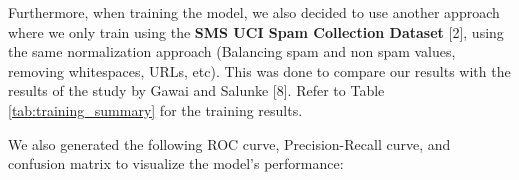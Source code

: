 \documentclass{article}
\begin{document}
\noindent
Furthermore, when training the model, we also decided to use another approach where we only train using the \textbf{SMS UCI Spam Collection Dataset} [2], using the same normalization approach (Balancing spam and non spam values, removing whitespaces, URLs, etc). This was done to compare our results with the results of the study by Gawai and Salunke [8]. Refer to Table \ref{tab:training_summary} for the training results.
\newline



\noindent
We also generated the following ROC curve, Precision-Recall curve, and confusion matrix to visualize the model's performance:
\end{document}
